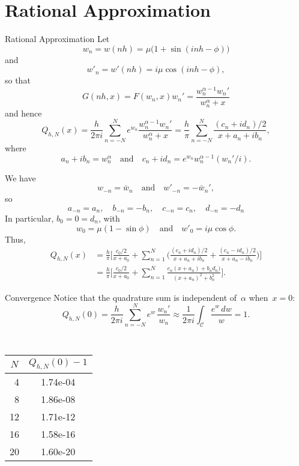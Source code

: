 \documentclass{beamer}
\begin{document}
\section{Rational Approximation}
\begin{frame}{Rational Approximation}
Let 
\[
w_n=w(nh)=\mu\bigl(1+\sin(inh-\phi)\bigr)
\]
and
\[
w'_n=w'(nh)=i\mu\cos(inh-\phi),
\]
so that
\[
G(nh,x)=F(w_n,x)w_n'=\frac{w_n^{\alpha-1}w_n'}{w_n^\alpha+x}
\]
and hence
\[
Q_{h,N}(x)=\frac{h}{2\pi i}\sum_{n=-N}^Ne^{w_n}
    \frac{w_n^{\alpha-1}w_n'}{w_n^\alpha+x}
    =\frac{h}{\pi}\sum_{n=-N}^N\frac{(c_n+id_n)/2}{x+a_n+ib_n},
\]
where
\[
a_n+ib_n=w_n^\alpha\quad\text{and}\quad
c_n+id_n=e^{w_n}w_n^{\alpha-1}(w_n'/i).
\]
\end{frame}
\begin{frame}
We have
\[
w_{-n}=\bar w_n\quad\text{and}\quad w'_{-n}=-\bar w_n',
\]
so
\[
a_{-n}=a_n,\quad b_{-n}=-b_n,\quad c_{-n}=c_n,\quad d_{-n}=-d_n
\]
In particular, $b_0=0=d_n$, with
\[
w_0=\mu(1-\sin\phi)\quad\text{and}\quad w'_0=i\mu\cos\phi.
\]
Thus,
\begin{align*}
Q_{h,N}(x)&=\frac{h}{\pi}\biggl[\frac{c_0/2}{x+a_0}+\sum_{n=1}^N
\biggl(\frac{(c_n+id_n)/2}{x+a_n+ib_n}+\frac{(c_n-id_n)/2}{x+a_n-ib_n}\biggr)
    \biggr]\\
&=\frac{h}{\pi}\biggl[\frac{c_0/2}{x+a_0}+\sum_{n=1}^N
    \frac{c_n(x+a_n)+b_nd_n)}{(x+a_n)^2+b_n^2}\biggr].
\end{align*}
\end{frame}
\begin{frame}{Convergence}
Notice that the quadrature sum is independent of~$\alpha$ when~$x=0$:
\[
Q_{h,N}(0)=\frac{h}{2\pi i}\sum_{n=-N}^Ne^w\,\frac{w_n'}{w_n}
    \approx\frac{1}{2\pi i}\int_{\mathcal{C}}\frac{e^w\,dw}{w}=1.
\]
\begin{center}
\renewcommand{\arraystretch}{1.2}
{\tt
\begin{tabular}{r|c}
\multicolumn{1}{c|}{$N$}&$Q_{h,N}(0)-1$\\
\hline
   4 &   1.74e-04 \\
   8 &   1.86e-08 \\
  12 &   1.71e-12 \\
  16 &   1.58e-16 \\
  20 &   1.60e-20 
\end{tabular}
}
\end{center}
\end{frame}
\end{document}
